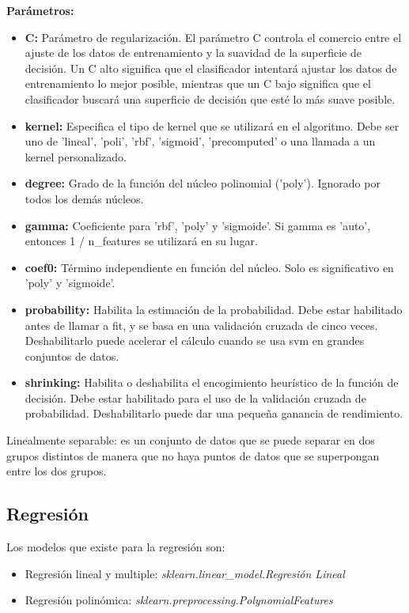 \documentclass[../main.tex]{subfiles}
\begin{document}
            \textbf{Parámetros:}
            \begin{itemize}
                \item \textbf{C:} Parámetro de regularización. El parámetro C controla el comercio entre el ajuste de los datos de entrenamiento y la suavidad de la superficie de decisión. Un C alto significa que el clasificador intentará ajustar los datos de entrenamiento lo mejor posible, mientras que un C bajo significa que el clasificador buscará una superficie de decisión que esté lo más suave posible.
                \item \textbf{kernel:} Especifica el tipo de kernel que se utilizará en el algoritmo. Debe ser uno de 'lineal', 'poli', 'rbf', 'sigmoid', 'precomputed' o una llamada a un kernel personalizado.
                \item \textbf{degree:} Grado de la función del núcleo polinomial ('poly'). Ignorado por todos los demás núcleos.
                \item \textbf{gamma:} Coeficiente para 'rbf', 'poly' y 'sigmoide'. Si gamma es 'auto', entonces 1 / n\_features se utilizará en su lugar.
                \item \textbf{coef0:} Término independiente en función del núcleo. Solo es significativo en 'poly' y 'sigmoide'.
                \item \textbf{probability:} Habilita la estimación de la probabilidad. Debe estar habilitado antes de llamar a fit, y se basa en una validación cruzada de cinco veces. Deshabilitarlo puede acelerar el cálculo cuando se usa svm en grandes conjuntos de datos.
                \item \textbf{shrinking:} Habilita o deshabilita el encogimiento heurístico de la función de decisión. Debe estar habilitado para el uso de la validación cruzada de probabilidad. Deshabilitarlo puede dar una pequeña ganancia de rendimiento.
            \end{itemize}

            Linealmente separable: es un conjunto de datos que se puede separar en dos grupos distintos de manera que no haya puntos de datos que se superpongan entre los dos grupos.\\
            
    \subsection{Regresión}
        Los modelos que existe para la regresión son:
        \begin{itemize}
            \item Regresión lineal y multiple: \textit{sklearn.linear\_model.Regresión Lineal}
            \item Regresión polinómica: \textit{sklearn.preprocessing.PolynomialFeatures}
        \end{itemize}
\end{document}
